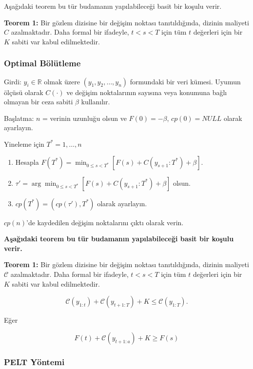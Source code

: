 \documentclass[12pt,twoside]{deuthesis}
\begin{document}
Aşağıdaki teorem bu tür budamanın yapılabileceği basit bir koşulu verir.

\textbf{Teorem 1:} Bir gözlem dizisine bir değişim noktası tanıtıldığında, dizinin maliyeti \(C\) azalmaktadır. Daha formal bir ifadeyle, \(t < s < T\) için tüm \(t\) değerleri için bir \(K\) sabiti var kabul edilmektedir.

\subsubsection{Optimal Bölütleme}\label{optimal-buxf6luxfctleme}

Girdi: \(y_i \in \mathbb{R}\) olmak üzere \((y_1, y_2, \ldots, y_n)\) formundaki bir veri kümesi. Uyumun ölçüsü olarak \(C(\cdot)\) ve değişim noktalarının sayısına veya konumuna bağlı olmayan bir ceza sabiti \(\beta\) kullanılır.

Başlatma: \(n\) = verinin uzunluğu olsun ve \(F(0) = -\beta\), \(cp(0) = NULL\) olarak ayarlayın.

Yineleme için \(T^* = 1, \ldots, n\)

\begin{enumerate}
\def\labelenumi{\arabic{enumi}.}
\item
  Hesapla \(F(T^*) = \min_{0 \leq s < T^*} [F(s) + C(y_{s+1}:T^*) + \beta]\).
\item
  \(\tau' = \arg \min_{0 \leq s < T^*} [F(s) + C(y_{s+1}:T^*) + \beta]\) olsun.
\item
  \(cp(T^*) = (cp(\tau'), T^*)\) olarak ayarlayın.
\end{enumerate}

\(cp(n)\)'de kaydedilen değişim noktalarını çıktı olarak verin.

\textbf{Aşağıdaki teorem bu tür budamanın yapılabileceği basit bir koşulu verir.}

\textbf{Teorem 1:} Bir gözlem dizisine bir değişim noktası tanıtıldığında, dizinin maliyeti \(\mathcal{C}\) azalmaktadır. Daha formal bir ifadeyle, \(t < s < T\) için tüm \(t\) değerleri için bir \(K\) sabiti var kabul edilmektedir.

\[
\mathcal{C}(y_{1:t}) + \mathcal{C}(y_{t+1:T}) + K \leq \mathcal{C}(y_{1:T}).
\]

Eğer

\[
F(t) + \mathcal{C}(y_{t+1:a}) + K \geq F(s)
\]

\subsubsection{PELT Yöntemi}\label{pelt-yuxf6ntemi}
\end{document}
